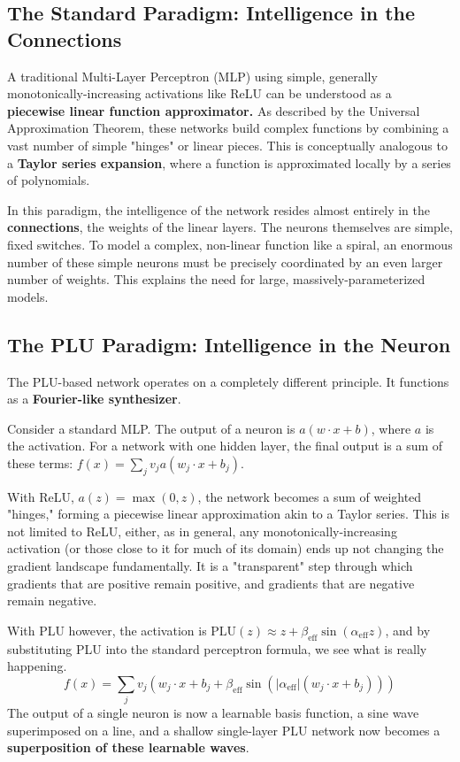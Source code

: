 \documentclass[11pt, letterpaper]{article}
\begin{document}
\subsection{The Standard Paradigm: Intelligence in the Connections}

A traditional Multi-Layer Perceptron (MLP) using simple, generally monotonically-increasing activations like ReLU can be understood as a \textbf{piecewise linear function approximator.} As described by the Universal Approximation Theorem, these networks build complex functions by combining a vast number of simple "hinges" or linear pieces. This is conceptually analogous to a \textbf{Taylor series expansion}, where a function is approximated locally by a series of polynomials.

In this paradigm, the intelligence of the network resides almost entirely in the \textbf{connections}, the weights of the linear layers. The neurons themselves are simple, fixed switches. To model a complex, non-linear function like a spiral, an enormous number of these simple neurons must be precisely coordinated by an even larger number of weights. This explains the need for large, massively-parameterized models.

\subsection{The PLU Paradigm: Intelligence in the Neuron}

The PLU-based network operates on a completely different principle. It functions as a \textbf{Fourier-like synthesizer}.

Consider a standard MLP. The output of a neuron is $a(w \cdot x + b)$, where $a$ is the activation. For a network with one hidden layer, the final output is a sum of these terms: $f(x) = \sum_j v_j a(w_j \cdot x + b_j)$.

With ReLU, $a(z) = \max(0, z)$, the network becomes a sum of weighted "hinges," forming a piecewise linear approximation akin to a Taylor series. This is not limited to ReLU, either, as in general, any monotonically-increasing activation (or those close to it for much of its domain) ends up not changing the gradient landscape fundamentally. It is a "transparent" step through which gradients that are positive remain positive, and gradients that are negative remain negative.

With PLU however, the activation is $\text{PLU}(z) \approx z + \beta_{\text{eff}} \sin(\alpha_{\text{eff}} z)$, and by substituting PLU into the standard perceptron formula, we see what is really happening.
\begin{equation}
    f(x) = \sum_j v_j \left( w_j \cdot x + b_j + \beta_{\text{eff}} \sin(\lvert\alpha_{\text{eff}}\rvert (w_j \cdot x + b_j)) \right)
    \label{eq:fourier_synthesis}
\end{equation}
The output of a single neuron is now a learnable basis function, a sine wave superimposed on a line, and a shallow single-layer PLU network now becomes a \textbf{superposition of these learnable waves}.
\end{document}
